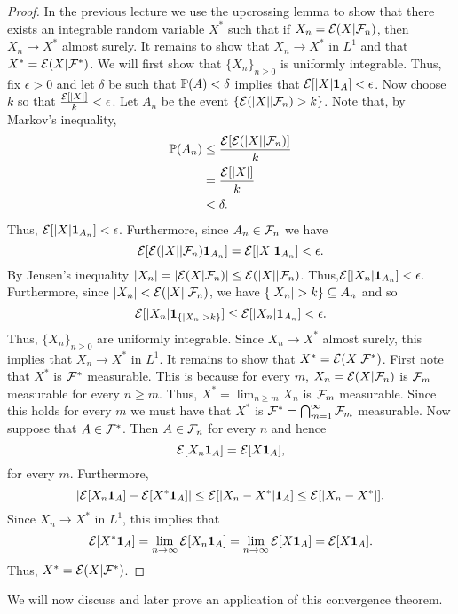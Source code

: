 \begin{proof}
    In the previous lecture we use the upcrossing lemma to show that there exists an integrable random variable $X^*$ such that if $X_n = {\mathcal{E}}(X|{\mathcal{F}}_n)$, then $X_n \to X^*$ almost surely. It remains to show that $X_n \to X^*$ in $L^1$ and that $X^*={\mathcal{E}}(X|{\mathcal{F}}^*)$. We will first show that $\{X_n\}_{n \ge 0}$ is uniformly integrable. Thus, fix $\epsilon >0$ and let $\delta$ be such that ${\mathbb{P}}(A) < \delta$ implies that ${\mathcal{E}}[{\left\lvert X\right\rvert}{{\bf 1}}_A] < \epsilon$. Now choose $k$ so that $\frac{{\mathcal{E}}[{\left\lvert X\right\rvert}]}{k} < \epsilon$. Let $A_n$ be the event $\{{\mathcal{E}}({\left\lvert X\right\rvert}|{\mathcal{F}}_n)>k\}$. Note that, by Markov's inequality,
    \begin{align*}
        {\mathbb{P}}(A_n) &\le \frac{{\mathcal{E}}[{\mathcal{E}}({\left\lvert X\right\rvert}|{\mathcal{F}}_n)]}{k}\\
        &=\frac{{\mathcal{E}}[{\left\lvert X\right\rvert}]}{k}\\
        &<\delta.
    \end{align*}
    Thus, ${\mathcal{E}}[{\left\lvert X\right\rvert}{{\bf 1}}_{A_n}]<\epsilon$. Furthermore, since $A_n \in {\mathcal{F}}_n$ we have
    \[{\mathcal{E}}[{\mathcal{E}}({\left\lvert X\right\rvert}|{\mathcal{F}}_n){{\bf 1}}_{A_n}] = {\mathcal{E}}[{\left\lvert X\right\rvert}{{\bf 1}}_{A_n}] <\epsilon. \]
    By Jensen's inequality ${\left\lvert X_n\right\rvert} = {\left\lvert{\mathcal{E}}(X|{\mathcal{F}}_n)\right\rvert} \le {\mathcal{E}}({\left\lvert X\right\rvert}|{\mathcal{F}}_n)$. Thus,${\mathcal{E}}[{\left\lvert X_n\right\rvert}{{\bf 1}}_{A_n}] <\epsilon.$
    Furthermore, since ${\left\lvert X_n\right\rvert} < {\mathcal{E}}({\left\lvert X\right\rvert}|{\mathcal{F}}_n)$, we have $\{{\left\lvert X_n\right\rvert}>k\} \subseteq A_n$ and so
    \[{\mathcal{E}}[{\left\lvert X_n\right\rvert}{{\bf 1}}_{\{{\left\lvert X_n\right\rvert}>k\}}] \le {\mathcal{E}}[{\left\lvert X_n\right\rvert}{{\bf 1}}_{A_n}] <\epsilon. \]
    Thus, $\{X_n\}_{n \ge 0}$ are uniformly integrable. Since $X_n \to X^*$ almost surely, this implies that $X_n \to X^*$ in $L^1$. It remains to show that $X^* = {\mathcal{E}}(X|{\mathcal{F}}^*)$. First note that $X^*$ is ${\mathcal{F}}^*$ measurable. This is because for every $m$, $X_n = {\mathcal{E}}(X|{\mathcal{F}}_n)$ is ${\mathcal{F}}_m$ measurable for every $n \ge m$. Thus, $X^* = \lim_{n \ge m} X_n$ is ${\mathcal{F}}_m$ measurable. Since this holds for every $m$ we must have that $X^*$ is ${\mathcal{F}}^* = \bigcap_{m=1}^\infty {\mathcal{F}}_m$ measurable. Now suppose that $A \in {\mathcal{F}}^*$. Then $A \in {\mathcal{F}}_n$ for every $n$ and hence 
    \[{\mathcal{E}}[X_n{{\bf 1}}_A]={\mathcal{E}}[X{{\bf 1}}_A], \]
    for every $m$. Furthermore, 
    \[{\left\lvert{\mathcal{E}}[X_n{{\bf 1}}_A]-{\mathcal{E}}[X^*{{\bf 1}}_A]\right\rvert} \le {\mathcal{E}}[{\left\lvert X_n-X^*\right\rvert}{{\bf 1}}_A]\le {\mathcal{E}}[{\left\lvert X_n-X^*\right\rvert}]. \]
    Since $X_n \to X^*$ in $L^1$, this implies that
    \[{\mathcal{E}}[X^*{{\bf 1}}_A] = \lim_{n \to \infty} {\mathcal{E}}[X_n{{\bf 1}}_A] = \lim_{n \to \infty}{\mathcal{E}}[X{{\bf 1}}_A]={\mathcal{E}}[X{{\bf 1}}_A]. \]
    Thus, $X^*={\mathcal{E}}(X|{\mathcal{F}}^*)$.
\end{proof}
We will now discuss and later prove an application of this convergence theorem.
